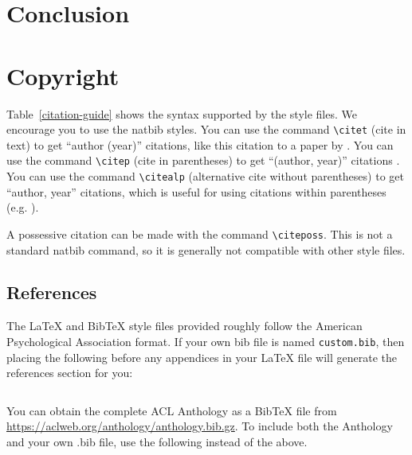 \documentclass[11pt]{article}
\begin{document}
\section{Conclusion}

\section{Copyright}

Table~\ref{citation-guide} shows the syntax supported by the style files.
We encourage you to use the natbib styles.
You can use the command \verb|\citet| (cite in text) to get ``author (year)'' citations, like this citation to a paper by \citet{Gusfield:97}.
You can use the command \verb|\citep| (cite in parentheses) to get ``(author, year)'' citations \citep{Gusfield:97}.
You can use the command \verb|\citealp| (alternative cite without parentheses) to get ``author, year'' citations, which is useful for using citations within parentheses (e.g. \citealp{Gusfield:97}).

A possessive citation can be made with the command \verb|\citeposs|.
This is not a standard natbib command, so it is generally not compatible
with other style files.

\subsection{References}

\nocite{Ando2005,andrew2007scalable,rasooli-tetrault-2015}

The \LaTeX{} and Bib\TeX{} style files provided roughly follow the American Psychological Association format.
If your own bib file is named \texttt{custom.bib}, then placing the following before any appendices in your \LaTeX{} file will generate the references section for you:
\begin{quote}
\begin{verbatim}

\end{verbatim}
\end{quote}

You can obtain the complete ACL Anthology as a Bib\TeX{} file from \url{https://aclweb.org/anthology/anthology.bib.gz}.
To include both the Anthology and your own .bib file, use the following instead of the above.
\begin{quote}
\begin{verbatim}

\end{verbatim}
\end{quote}
\end{document}

